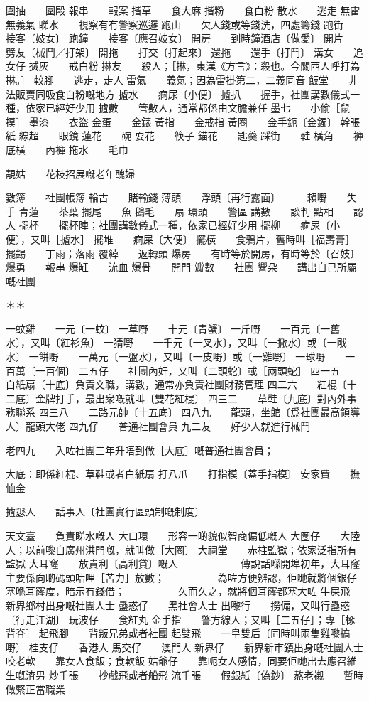 圍抽　　圍毆  
報串　　報案  
揩草　　食大麻  
揩粉　　食白粉  
散水　　逃走  
無雷　　無義氣  
睇水　　視察有冇警察巡邏  
跑山　　欠人錢或等錢洗，四處籌錢  
跑街　　接客〔妓女〕  
跑鐘　　接客〔應召妓女〕  
開房　　到時鐘酒店〔做愛〕  
開片　　劈友〔械鬥／打架〕  
開拖　　打交〔打起來〕  
還拖　　還手〔打鬥〕  
溝女　　追女仔  
搣灰　　戒白粉  
㨆友　　殺人；［㨆，東漢《方言》：殺也。今關西人呼打為㨆。］  
較腳　　逃走，走人  
雷氣　　義氣；因為雷掛第二，二義同音  
飯堂　　非法販賣同吸食白粉嘅地方  
摣水　　痾尿〔小便〕  
摣扒　　握手，社團講數儀式一種，依家已經好少用  
摣數　　管數人，通常都係由文膽兼任  
墨七　　小偷［鼠摸］  
墨漆　　衣盜  
金蛋　　金錶  
黃指　　金戒指  
黃圈　　金手鈪〔金鐲〕  
幹張　　紙  
線超　　眼鏡  
蓮花　　碗  
耍花　　筷子  
錨花　　匙羹  
踩街　　鞋  
橫角　　褲  
底橫　　內褲  
拖水　　毛巾  

靚姑　　花枝招展嘅老年醜婦

數簿　　社團帳簿  
輪古　　賭輸錢  
薄頭　　浮頭〔再行露面〕 　　  
賴嘢　　失手  
青蓮　　茶葉  
擺尾　　魚  
鵝毛　　扇  
環頭　　警區  
講數　　談判  
點相　　認人  
擺杯　　擺杯陣；社團講數儀式一種，依家已經好少用  
擺柳　　痾尿〔小便〕，又叫［摣水］  
擺堆　　痾屎〔大便〕  
擺橫　　食鴉片，舊時叫［福壽膏］  
擺錫　　丁雨；落雨  
覆綽　　返轉頭  
爆房　　有時等於開房，有時等於〔召妓〕  
爆勇　　報串  
爆缸　　流血  
爆骨　　開門  
瓣數　　社團  
響朵　　講出自己所屬嘅社團  
  
＊＊———————————————————————————————  
  
一蚊雞　　一元〔一蚊〕  
一草嘢　　十元〔青蟹〕  
一斤嘢　　一百元〔一舊水〕，又叫〔紅衫魚〕  
一猜嘢　　一千元〔一叉水〕，又叫〔一撇水〕或〔一戙水〕  
一餅嘢　　一萬元〔一盤水〕，又叫〔一皮嘢〕或〔一雞嘢〕  
一球嘢　　一百萬〔一百個〕  
二五仔　　社團內奸，又叫〔二頭蛇〕或［兩頭蛇］  
四一五　　白紙扇〔十底〕負責文職，講數，通常亦負責社團財務管理  
四二六　　紅棍〔十二底〕金牌打手，最出衆嘅就叫〔雙花紅棍〕  
四三二　　草鞋〔九底〕對內外事務聯系  
四三八　　二路元帥〔十五底〕  
四八九　　龍頭，坐館〔爲社團最高領導人〕龍頭大佬  
四九仔　　普通社團會員  
九二友　　好少人就進行械鬥  

老四九　　入咗社團三年升唔到做［大底］嘅普通社團會員；

大底：即係紅棍、草鞋或者白紙扇  
打八爪　　打指模〔蓋手指模〕  
安家費　　撫恤金  

摣𢞵人　　話事人〔社團實行區頭制嘅制度〕

天文臺　　負責睇水嘅人  
大口環　　形容一啲貌似智商偏低嘅人  
大圈仔　　大陸人；以前嚟自廣州洪門嘅，就叫做［大圈〕  
大祠堂　　赤柱監獄；依家泛指所有監獄  
大耳窿　　放貴利〔高利貸〕嘅人　  
　　　　　傳說話喺開埠初年，大耳窿主要係向啲碼頭咕哩［苦力］放數；  
　　　　　為咗方便辨認，佢哋就將個銀仔塞喺耳窿度，暗示有錢借；  
　　　　　久而久之，就將個耳窿都塞大咗  
牛屎飛　　新界鄉村出身嘅社團人士  
蠱惑仔　　黑社會人士  
出嚟行　　撈偏，又叫行蠱惑〔行走江湖〕  
玩波仔　　食紅丸  
金手指　　警方線人；又叫［二五仔］；專［椓背脊］  
起飛腳　　背叛兄弟或者社團  
起雙飛　　一皇雙后〔同時叫兩隻雞嚟搞嘢〕  
桂支仔　　香港人  
馬交仔　　澳門人  
新界仔　　新界新市鎮出身嘅社團人士  
咬老軟　　靠女人食飯；食軟飯  
姑爺仔　　靠呃女人感情，同要佢哋出去應召維生嘅渣男  
炒千張　　抄戲飛或者船飛  
流千張　　假銀紙〔偽鈔〕  
熬老襯　　暫時做緊正當職業  

